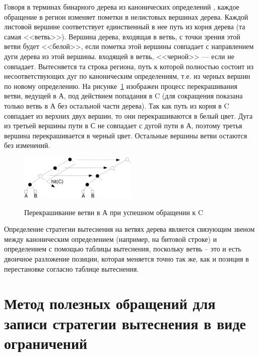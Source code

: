 Говоря в терминах бинарного дерева из канонических определений \PseudoLRU, каждое обращение в регион изменяет пометки в нелистовых вершинах дерева. Каждой листовой вершине соответствует единственный в нее путь из корня дерева (та самая <<ветвь>>). Вершина дерева, входящая в ветвь, с точки зрения этой ветви будет <<белой>>, если пометка этой вершины совпадает с направлением дуги дерева из этой вершины. входящей в ветвь, <<черной>> --- если не совпадает. Вытесняется та строка региона, путь к которой полностью состоит из несоответствующих дуг по каноническим определениям, т.е. из черных вершин по новому определению. На рисунке~\ref{recolor}
изображен процесс перекрашивания ветви, ведущей в А, под действием
попадания в C (для сокращения показана только ветвь в А без
остальной части дерева). Так как путь из корня в C совпадает из
верхних двух вершин, то они перекрашиваются в белый цвет. Дуга из
третьей вершины пути в С не совпадает с дугой пути в А, поэтому
третья вершина перекрашивается в черный цвет. Остальные вершины
ветви остаются без изменений.

\begin{figure}[h] \center
  \includegraphics[width=0.5\textwidth]{1.review/recolor}\\
  \caption{Перекрашивание ветви в А при успешном обращении к C}\label{recolor}
\end{figure}


Определение стратегии вытеснения \PseudoLRU на ветвях дерева
является связующим звеном между каноническим определением (например,
на битовой строке) и определением с помощью таблицы вытеснения,
поскольку ветвь -- это и есть двоичное разложение позиции, которая меняется точно так же, как и позиция в перестановке согласно таблице вытеснения.



\section{Метод полезных обращений для записи стратегии вытеснения в виде ограничений}\label{sec:usefulness_functions}


